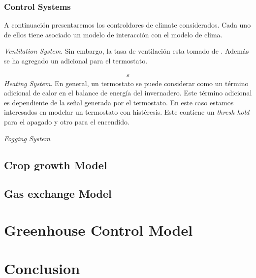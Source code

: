 \documentclass[5p,twocolumn]{elsarticle}
\begin{document}
\subsubsection{Control Systems}

A continuación presentaremos los controldores de climate considerados. Cada uno de ellos tiene asociado un modelo de interacción con el modelo de clima.


\textit{Ventilation System}. Sin embargo, la tasa de ventilación esta tomado de \cite{Boulard1987}. Además se ha agregado un adicional para el termostato. 

\begin{gather}
    s
\end{gather}
\textit{Heating System}. En general, un termostato se puede considerar como un término adicional de calor en el balance de energía del invernadero. Este término adicional es dependiente de la señal generada por el termostato. En este caso estamos interesados en modelar un termostato con histéresis. Este contiene un \emph{thresh hold} para el apagado y otro para el encendido. 


\textit{Fogging System}

\subsection{Crop growth Model}

\subsection{Gas exchange Model}


\section{Greenhouse Control Model}


\section{}
\section{Conclusion}


\end{document}
